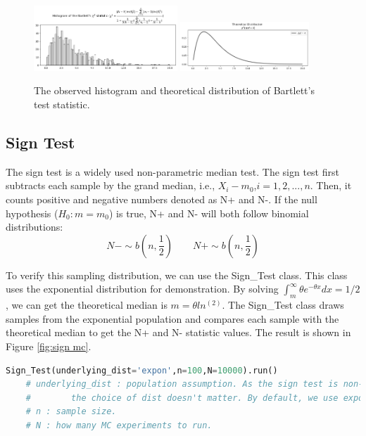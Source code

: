 \documentclass[11pt, letterpaper]{article}
\begin{document}
\begin{figure}[htbp]
    \centering
    \includegraphics[width=0.48\textwidth]{fig13-bartlett mc1.png}
    \includegraphics[width=0.43\textwidth]{fig13-bartlett mc2.png}
    \caption{The observed histogram and theoretical distribution of Bartlett's test statistic.}
    \label{fig: bartlett mc}
\end{figure}

\subsection{Sign Test}
The sign test is a widely used non-parametric median test. The sign test first subtracts each sample
by the grand median, i.e., $X_{i}-m_{0}$,$i=1,2,...,n$. Then, it counts positive and negative numbers
denoted as N+ and N-. If the null hypothesis ($H_{0}:m=m_{0}$) is true, N+ and N- will both follow
binomial distributions:
\begin{equation}
    \label{deqn_ex12}
    N- \sim b(n,\frac{1}{2}) \qquad  N+ \sim b(n,\frac{1}{2})
\end{equation}

To verify this sampling distribution, we can use the Sign\_Test class. This class uses
the exponential distribution for demonstration. By solving $\int_{m}^{\infty}\theta e^{-\theta x}dx = 1/2$,
we can get the theoretical median is $m=\theta ln^{(2)}$. The Sign\_Test class draws samples
from the exponential population and compares each sample with the theoretical median to get the N+ and N-
statistic values. The result is shown in Figure \ref{fig:sign mc}.

\lstset{
    basicstyle=\footnotesize,
    xleftmargin=-1em,aboveskip=0.5em,belowskip=0.5em
}
\begin{lstlisting}[language=python]
    Sign_Test(underlying_dist='expon',n=100,N=10000).run()
    # underlying_dist : population assumption. As the sign test is non-parametric, 
    #        the choice of dist doesn't matter. By default, we use exponential. 
    # n : sample size.
    # N : how many MC experiments to run.
    \end{lstlisting}
\end{document}
